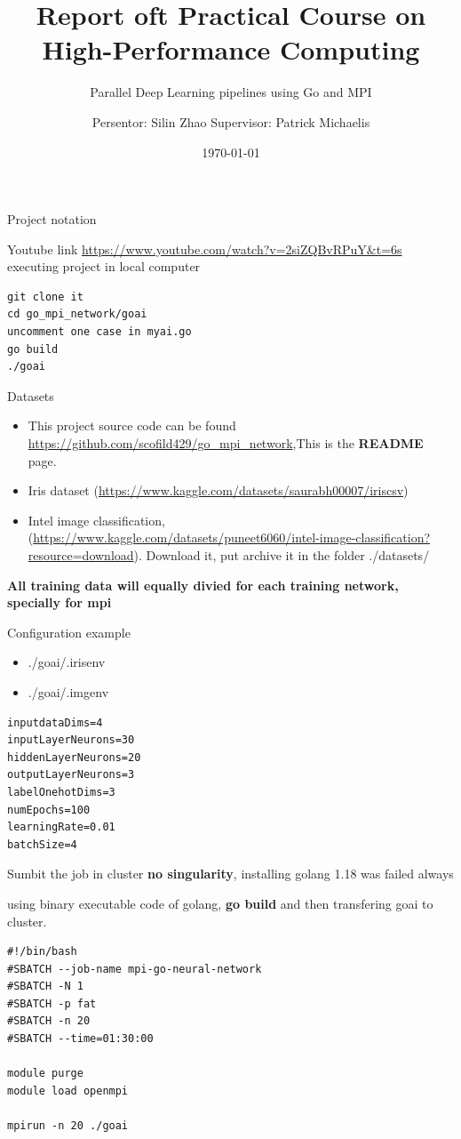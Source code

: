\documentclass[presentation]{beamer}
\author{Persentor: Silin Zhao Supervisor: Patrick Michaelis}
\date{\today}
\title{Report oft Practical Course on High-Performance Computing}
\subtitle{ Parallel Deep Learning pipelines using Go and MPI }
\begin{document}
\maketitle
\begin{frame}[label={sec:org440efb7},fragile]{Project notation}
 \begin{block}{Youtube link}
\url{https://www.youtube.com/watch?v=2siZQBvRPuY\&t=6s}
executing project in local computer
\begin{verbatim}
git clone it
cd go_mpi_network/goai
uncomment one case in myai.go
go build
./goai
\end{verbatim}
\end{block}
\end{frame}

\begin{frame}[label={sec:org61c86ac}]{Datasets}
\begin{itemize}
\item This project source code can be found \url{https://github.com/scofild429/go\_mpi\_network},This is the \textbf{README} page.
\item Iris dataset (\url{https://www.kaggle.com/datasets/saurabh00007/iriscsv})
\item Intel image classification, (\url{https://www.kaggle.com/datasets/puneet6060/intel-image-classification?resource=download}). Download it,  put archive it in the folder ./datasets/
\end{itemize}

\textbf{All training data will equally divied for each training network, specially for mpi}
\end{frame}

\begin{frame}[label={sec:org84200ee},fragile]{Configuration  example}
 \begin{itemize}
\item ./goai/.irisenv
\item ./goai/.imgenv
\end{itemize}
\begin{verbatim}
inputdataDims=4
inputLayerNeurons=30
hiddenLayerNeurons=20
outputLayerNeurons=3
labelOnehotDims=3
numEpochs=100
learningRate=0.01
batchSize=4
\end{verbatim}
\end{frame}

\begin{frame}[label={sec:orgf5eb9da},fragile]{Sumbit the job in cluster}
 \textbf{no singularity}, installing golang 1.18 was failed always

using binary executable code of golang, \textbf{go build} and then transfering goai to cluster.

\begin{verbatim}
#!/bin/bash
#SBATCH --job-name mpi-go-neural-network
#SBATCH -N 1
#SBATCH -p fat
#SBATCH -n 20
#SBATCH --time=01:30:00

module purge
module load openmpi

mpirun -n 20 ./goai
\end{verbatim}
\end{frame}
\end{document}
